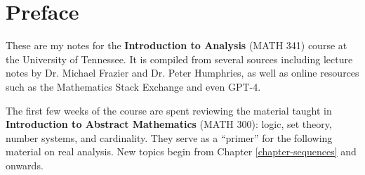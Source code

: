 \chapter*{Preface}
These are my notes for the \textbf{Introduction to Analysis} (MATH 341) course at the University of Tennessee. It is compiled from several sources including lecture notes by Dr. Michael Frazier and Dr. Peter Humphries, as well as online resources such as the Mathematics Stack Exchange and even GPT-4.

The first few weeks of the course are spent reviewing the material taught in \textbf{Introduction to Abstract Mathematics} (MATH 300): logic, set theory, number systems, and cardinality. They serve as a ``primer'' for the following material on real analysis. New topics begin from Chapter \ref{chapter-sequences} and onwards.
